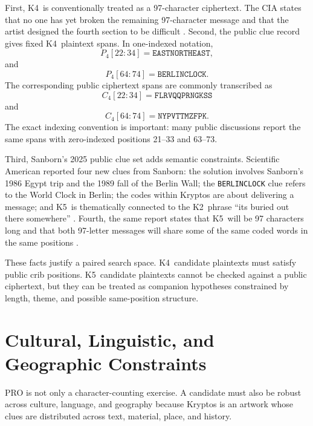 \documentclass[12pt]{paperFormatting}
\newcommand{\Kfour}{K4}
\newcommand{\Kfive}{K5}
\newcommand{\Ktwo}{K2}
\newcommand{\Cipher}{C}
\newcommand{\Plain}{P}
\begin{document}
\begin{thesisbody}
First, \Kfour\ is conventionally treated as a 97-character ciphertext. The CIA states that no one has yet broken the remaining 97-character message and that the artist designed the fourth section to be difficult \cite{ciaKryptosSculpture}. Second, the public clue record gives fixed \Kfour\ plaintext spans. In one-indexed notation,
\begin{equation}
    \Plain_4[22:34] = \texttt{EASTNORTHEAST},
\end{equation}
and
\begin{equation}
    \Plain_4[64:74] = \texttt{BERLINCLOCK}.
\end{equation}
The corresponding public ciphertext spans are commonly transcribed as
\begin{equation}
    \Cipher_4[22:34] = \texttt{FLRVQQPRNGKSS}
\end{equation}
and
\begin{equation}
    \Cipher_4[64:74] = \texttt{NYPVTTMZFPK}.
\end{equation}
The exact indexing convention is important: many public discussions report the same spans with zero-indexed positions 21--33 and 63--73.

Third, Sanborn's 2025 public clue set adds semantic constraints. Scientific American reported four new clues from Sanborn: the solution involves Sanborn's 1986 Egypt trip and the 1989 fall of the Berlin Wall; the \texttt{BERLINCLOCK} clue refers to the World Clock in Berlin; the codes within Kryptos are about delivering a message; and \Kfive\ is thematically connected to the \Ktwo\ phrase ``its buried out there somewhere'' \cite{verganoFinalClues2025}. Fourth, the same report states that \Kfive\ will be 97 characters long and that both 97-letter messages will share some of the same coded words in the same positions \cite{verganoFinalClues2025}.

These facts justify a paired search space. \Kfour\ candidate plaintexts must satisfy public crib positions. \Kfive\ candidate plaintexts cannot be checked against a public ciphertext, but they can be treated as companion hypotheses constrained by length, theme, and possible same-position structure.

\section{Cultural, Linguistic, and Geographic Constraints}
PRO is not only a character-counting exercise. A candidate must also be robust across culture, language, and geography because Kryptos is an artwork whose clues are distributed across text, material, place, and history.


\end{thesisbody}
\end{document}
